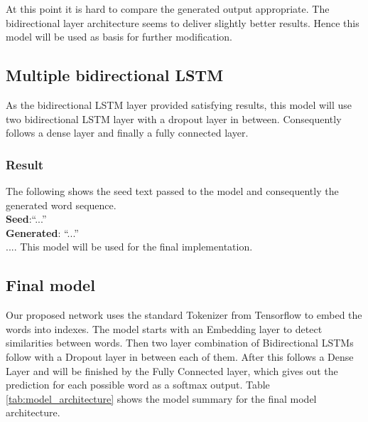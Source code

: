 \documentclass[conference]{IEEEtran}
\begin{document}
At this point it is hard to compare the generated output appropriate. The bidirectional layer architecture seems to deliver slightly better results. Hence this model will be used as basis for further modification.

\subsection{Multiple bidirectional LSTM}

As the bidirectional LSTM layer provided satisfying results, this model will use two bidirectional LSTM layer with a dropout layer in between. Consequently follows a dense layer and finally a fully connected layer.\\

\subsubsection{Result}

The following shows the seed text passed to the model and consequently the generated word sequence.\\

\textbf{Seed}:``...''\\

\textbf{Generated}: ``...''\\

.... This model will be used for the final implementation.

\subsection{Final model}

Our proposed network uses the standard Tokenizer from Tensorflow to embed the words into indexes. The model starts with an Embedding layer to detect similarities between words. Then two layer combination of Bidirectional LSTMs follow with a Dropout layer in between each of them. After this follows a Dense Layer and will be finished by the Fully Connected layer, which gives out the prediction for each possible word as a softmax output. Table \ref{tab:model_architecture} shows the model summary for the final model architecture.
\end{document}
